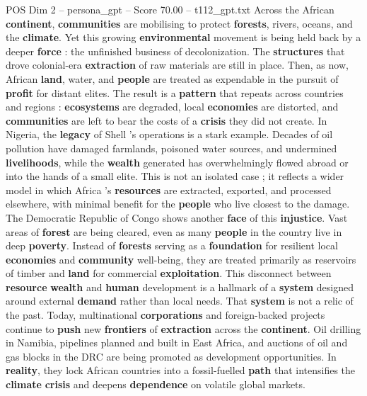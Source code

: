 \begin{textsample}{POS Dim 2 – persona\_gpt – Score 70.00 – t112\_gpt.txt}  \label{ex:f2_pos_001}
Across the African \textbf{continent}, \textbf{communities} are mobilising to protect \textbf{forests}, rivers, oceans, and the \textbf{climate}.
Yet this growing \textbf{environmental} movement is being held back by a deeper \textbf{force} : the unfinished business of decolonization.
The \textbf{structures} that drove colonial-era \textbf{extraction} of raw materials are still in place.
Then, as now, African \textbf{land}, water, and \textbf{people} are treated as expendable in the pursuit of \textbf{profit} for distant elites.
The result is a \textbf{pattern} that repeats across countries and regions : \textbf{ecosystems} are degraded, local \textbf{economies} are distorted, and \textbf{communities} are left to bear the costs of a \textbf{crisis} they did not create.
In Nigeria, the \textbf{legacy} of Shell ’s operations is a stark example.
Decades of oil pollution have damaged farmlands, poisoned water sources, and undermined \textbf{livelihoods}, while the \textbf{wealth} generated has overwhelmingly flowed abroad or into the hands of a small elite.
This is not an isolated case ; it reflects a wider model in which Africa ’s \textbf{resources} are extracted, exported, and processed elsewhere, with minimal benefit for the \textbf{people} who live closest to the damage.
The Democratic Republic of Congo shows another \textbf{face} of this \textbf{injustice}.
Vast areas of \textbf{forest} are being cleared, even as many \textbf{people} in the country live in deep \textbf{poverty}.
Instead of \textbf{forests} serving as a \textbf{foundation} for resilient local \textbf{economies} and \textbf{community} well-being, they are treated primarily as reservoirs of timber and \textbf{land} for commercial \textbf{exploitation}.
This disconnect between \textbf{resource} \textbf{wealth} and \textbf{human} development is a hallmark of a \textbf{system} designed around external \textbf{demand} rather than local needs.
That \textbf{system} is not a relic of the past.
Today, multinational \textbf{corporations} and foreign-backed projects continue to \textbf{push} new \textbf{frontiers} of \textbf{extraction} across the \textbf{continent}.
Oil drilling in Namibia, pipelines planned and built in East Africa, and auctions of oil and gas blocks in the DRC are being promoted as development opportunities.
In \textbf{reality}, they lock African countries into a fossil-fuelled \textbf{path} that intensifies the \textbf{climate} \textbf{crisis} and deepens \textbf{dependence} on volatile global markets.

\end{textsample}
